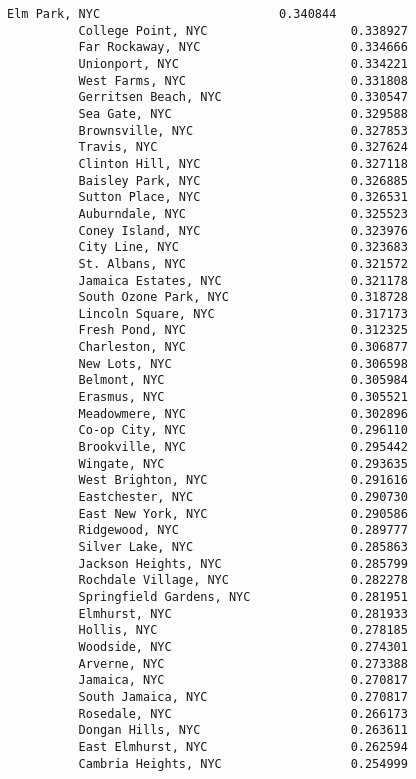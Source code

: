 \documentclass[11pt]{article}
\begin{document}
\begin{Verbatim}[commandchars=\\\{\}]
          Elm Park, NYC                         0.340844
          College Point, NYC                    0.338927
          Far Rockaway, NYC                     0.334666
          Unionport, NYC                        0.334221
          West Farms, NYC                       0.331808
          Gerritsen Beach, NYC                  0.330547
          Sea Gate, NYC                         0.329588
          Brownsville, NYC                      0.327853
          Travis, NYC                           0.327624
          Clinton Hill, NYC                     0.327118
          Baisley Park, NYC                     0.326885
          Sutton Place, NYC                     0.326531
          Auburndale, NYC                       0.325523
          Coney Island, NYC                     0.323976
          City Line, NYC                        0.323683
          St. Albans, NYC                       0.321572
          Jamaica Estates, NYC                  0.321178
          South Ozone Park, NYC                 0.318728
          Lincoln Square, NYC                   0.317173
          Fresh Pond, NYC                       0.312325
          Charleston, NYC                       0.306877
          New Lots, NYC                         0.306598
          Belmont, NYC                          0.305984
          Erasmus, NYC                          0.305521
          Meadowmere, NYC                       0.302896
          Co-op City, NYC                       0.296110
          Brookville, NYC                       0.295442
          Wingate, NYC                          0.293635
          West Brighton, NYC                    0.291616
          Eastchester, NYC                      0.290730
          East New York, NYC                    0.290586
          Ridgewood, NYC                        0.289777
          Silver Lake, NYC                      0.285863
          Jackson Heights, NYC                  0.285799
          Rochdale Village, NYC                 0.282278
          Springfield Gardens, NYC              0.281951
          Elmhurst, NYC                         0.281933
          Hollis, NYC                           0.278185
          Woodside, NYC                         0.274301
          Arverne, NYC                          0.273388
          Jamaica, NYC                          0.270817
          South Jamaica, NYC                    0.270817
          Rosedale, NYC                         0.266173
          Dongan Hills, NYC                     0.263611
          East Elmhurst, NYC                    0.262594
          Cambria Heights, NYC                  0.254999

\end{Verbatim}
\end{document}
